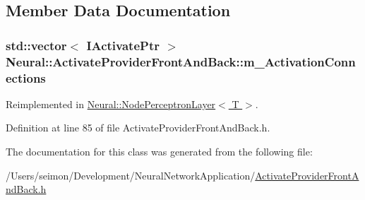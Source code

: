 \subsection{Member Data Documentation}
\hypertarget{class_neural_1_1_activate_provider_front_and_back_abaaf9f8b1b2711b9c48f5beb33f7cc85}{
\subsubsection[{m\_\-ActivationConnections}]{\setlength{\rightskip}{0pt plus 5cm}std::vector$<$ {\bf IActivatePtr} $>$ {\bf Neural::ActivateProviderFrontAndBack::m\_\-ActivationConnections}}}
\label{class_neural_1_1_activate_provider_front_and_back_abaaf9f8b1b2711b9c48f5beb33f7cc85}


Reimplemented in \hyperlink{class_neural_1_1_node_perceptron_layer_a464ec62bde0bc4d28e81042b19d95bbd}{Neural::NodePerceptronLayer$<$ T $>$}.



Definition at line 85 of file ActivateProviderFrontAndBack.h.



The documentation for this class was generated from the following file:\begin{DoxyCompactItemize}
\item 
/Users/seimon/Development/NeuralNetworkApplication/\hyperlink{_activate_provider_front_and_back_8h}{ActivateProviderFrontAndBack.h}\end{DoxyCompactItemize}
